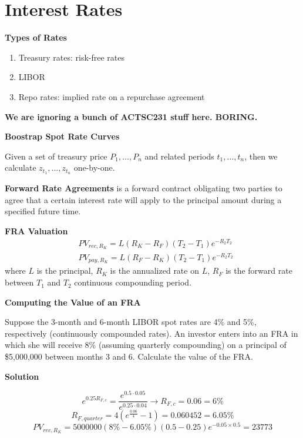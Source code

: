 \documentclass[11pt,fleqn]{report} %
\numberwithin{equation}{section} %
\numberwithin{figure}{section} %
\numberwithin{table}{section} %
\begin{document}
\chapter{Interest Rates}
\begin{definition}\textbf{Types of Rates}
\begin{enumerate}
    \item Treasury rates: risk-free rates
    \item LIBOR
    \item Repo rates: implied rate on a repurchase agreement
\end{enumerate}
\end{definition}
\begin{remark}\textbf{We are ignoring a bunch of ACTSC231 stuff here. BORING.}
\end{remark}
\begin{theorem}\textbf{Boostrap Spot Rate Curves}

Given a set of treasury price $P_1,\dots,P_n$ and related periods $t_1,\dots,t_n$, then we calculate $z_{t_1},\dots,z_{t_n}$ one-by-one.

\end{theorem}
\begin{definition}\textbf{Forward Rate Agreements} is a forward contract obligating two parties to agree that a certain interest rate will apply to the principal amount during a specified future time. 
\end{definition}
\begin{theorem}\textbf{FRA Valuation}
\begin{align*}
    &PV_{rec,R_K}=L(R_K-R_F)(T_2-T_1)e^{-R_2T_2}\\
    &PV_{pay,R_K}=L(R_F-R_K)(T_2-T_1)e^{-R_2T_2}
\end{align*}
where $L$ is the principal, $R_K$ is the annualized rate on $L$, $R_F$ is the forward rate between $T_1$ and $T_2$ continuous compounding period. 
\end{theorem}
\begin{exercise}\textbf{Computing the Value of an FRA}

Suppose the 3-month and 6-month LIBOR spot rates are 4\% and 5\%, respectively
(continuously compounded rates). An investor enters into an FRA in which she will
receive 8\% (assuming quarterly compounding) on a principal of \$5,000,000 between
months 3 and 6. Calculate the value of the FRA.

\textbf{Solution}

$$
e^{0.25R_{F,c}}=\frac{e^{0.5\cdot 0.05}}{e^{0.25\cdot 0.04}}\to R_{F,c}=0.06=6\%
$$
$$
R_{F,quarter}=4\left(e^{\frac{0.06}{4}}-1\right)=0.060452=6.05\%
$$
$$
PV_{rec,R_K}=5000000(8\%-6.05\%)(0.5-0.25)e^{-0.05\times 0.5}=23773
$$
\end{exercise}
\end{document}
